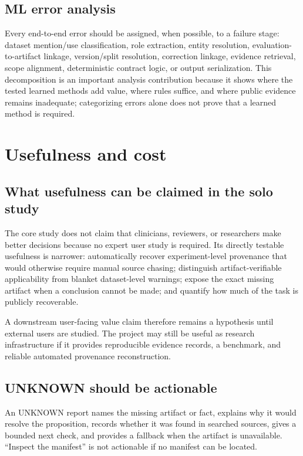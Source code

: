 \documentclass[11pt,a4paper]{article}
\begin{document}
\subsection{ML error analysis}
Every end-to-end error should be assigned, when possible, to a failure stage: dataset mention/use classification, role extraction, entity resolution, evaluation-to-artifact linkage, version/split resolution, correction linkage, evidence retrieval, scope alignment, deterministic contract logic, or output serialization. This decomposition is an important analysis contribution because it shows where the tested learned methods add value, where rules suffice, and where public evidence remains inadequate; categorizing errors alone does not prove that a learned method is required.

\section{Usefulness and cost}
\label{sec:usefulness}
\subsection{What usefulness can be claimed in the solo study}
The core study does not claim that clinicians, reviewers, or researchers make better decisions because no expert user study is required. Its directly testable usefulness is narrower: automatically recover experiment-level provenance that would otherwise require manual source chasing; distinguish artifact-verifiable applicability from blanket dataset-level warnings; expose the exact missing artifact when a conclusion cannot be made; and quantify how much of the task is publicly recoverable.

A downstream user-facing value claim therefore remains a hypothesis until external users are studied. The project may still be useful as research infrastructure if it provides reproducible evidence records, a benchmark, and reliable automated provenance reconstruction.

\subsection{UNKNOWN should be actionable}
An UNKNOWN report names the missing artifact or fact, explains why it would resolve the proposition, records whether it was found in searched sources, gives a bounded next check, and provides a fallback when the artifact is unavailable. ``Inspect the manifest'' is not actionable if no manifest can be located.
\end{document}
